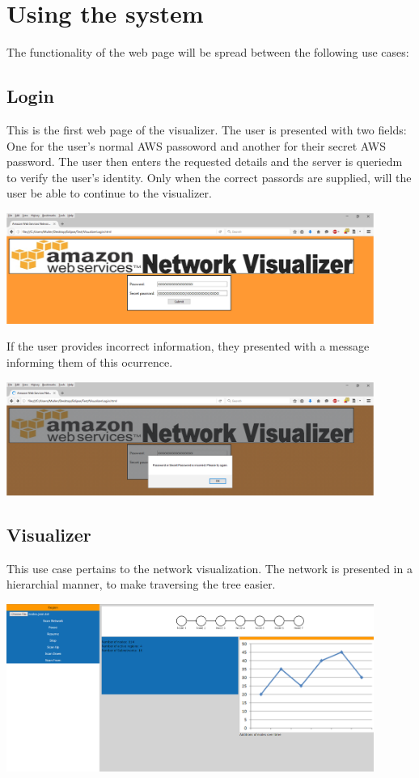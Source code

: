 \documentclass[hidelinks,a4paper,12pt]{article}
\begin{document}
\section{Using the system}
The functionality of the web page will be spread between the following use cases:

	\subsection{Login}
	
			This is the first web page of the visualizer. The user is presented with two fields: One for the user's normal AWS passoword and another for their secret AWS password. The user then enters the requested details and the server is queriedm to verify the user's identity. Only when the correct passords are supplied, will the user be able to continue to the visualizer.
		
    		\includegraphics[width=0.9\textwidth]{./images/Login1.png}
    		
    		If the user provides incorrect information, they presented with a message informing them of this ocurrence.
    		
		  	\includegraphics[width=0.9\textwidth]{./images/Login2.png}

	\newpage	
	\subsection{Visualizer}
		This use case pertains to the network visualization. The network is presented in a hierarchial manner, to make traversing the tree easier.
		
		\includegraphics[width=0.9\textwidth]{./images/Visualizer1.png}
\end{document}
